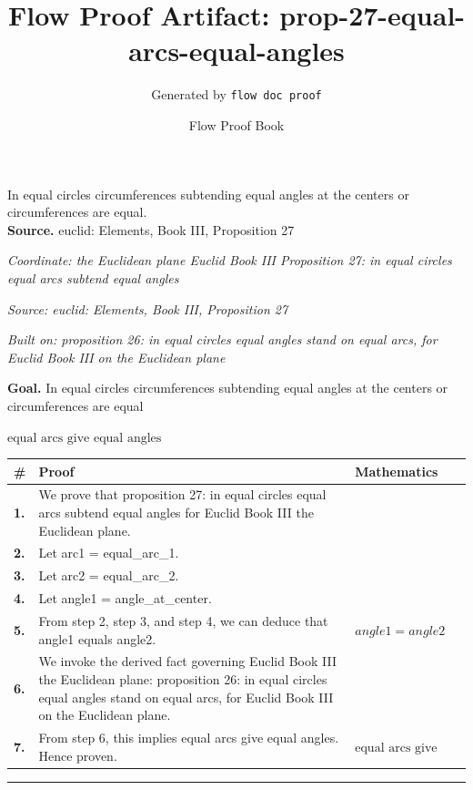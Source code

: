 \documentclass[11pt]{article}
\title{Flow Proof Artifact: prop-27-equal-arcs-equal-angles}
\author{Generated by \texttt{flow doc proof}}
\date{Flow Proof Book}
\theoremstyle{definition}
\begin{document}
\maketitle
In equal circles circumferences subtending equal angles at the centers or circumferences are equal.\\[0.5em]
\textbf{Source.} euclid: Elements, Book III, Proposition 27\\[0.5em]
\bigskip
{}\par
\smallskip\noindent\textit{Coordinate: the Euclidean plane \cdot Euclid Book III \cdot Proposition 27: in equal circles equal arcs subtend equal angles}\par
\smallskip\noindent\textit{Source: euclid: Elements, Book III, Proposition 27}\par
\smallskip\noindent\textit{Built on: proposition 26: in equal circles equal angles stand on equal arcs, for Euclid Book III on the Euclidean plane}\par
\medskip
\noindent\textbf{Goal.} In equal circles circumferences subtending equal angles at the centers or circumferences are equal\par
\noindent$\displaystyle \text{equal arcs give equal angles}$\par
\medskip
\noindent
\begin{tabular}{@{} >{\raggedright\arraybackslash}p{} >{\raggedright\arraybackslash}p{} >{\raggedleft\arraybackslash}p{} @{}}
\textbf{\#} & \textbf{Proof} & \textbf{Mathematics} \\
\midrule
\textbf{1.} & We prove that proposition 27: in equal circles equal arcs subtend equal angles for Euclid Book III the Euclidean plane. & \\[0.45em]
\textbf{2.} & Let arc1 = equal\_arc\_1. & \\[0.45em]
\textbf{3.} & Let arc2 = equal\_arc\_2. & \\[0.45em]
\textbf{4.} & Let angle1 = angle\_at\_center. & \\[0.45em]
\textbf{5.} & From step 2, step 3, and step 4, we can deduce that angle1 equals angle2. & $\displaystyle angle1 = angle2$ \\[0.45em]
\textbf{6.} & We invoke the derived fact governing Euclid Book III the Euclidean plane: proposition 26: in equal circles equal angles stand on equal arcs, for Euclid Book III on the Euclidean plane. & \\[0.45em]
\textbf{7.} & From step 6, this implies equal arcs give equal angles. Hence proven. & $\displaystyle \text{equal arcs give equal angles}$ \\[0.45em]
\bottomrule
\end{tabular}
\label{thm:Geometry-Euclid Book III-proposition_27_in_equal_circles_equal_arcs_subtend_equal_angles}
\par\medskip\hrule
\end{document}
